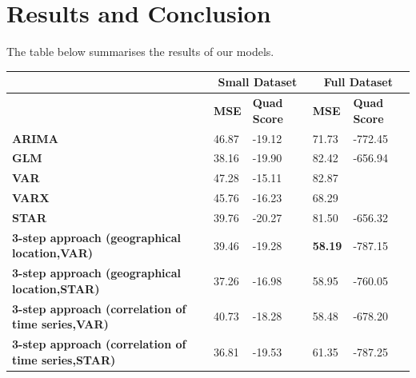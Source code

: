 \documentclass[nonblindrev,msom]{informs3} %
\begin{document}
\newpage
\section{Results and Conclusion}
The table below summarises the results of our models. 

\begin{table}[H]
\begin{tabular}{|l|l|l|l|l|}
\hline
                                                                      & \multicolumn{2}{c|}{\textbf{Small Dataset}} & \multicolumn{2}{c|}{\textbf{Full Dataset}} \\ \hline
                                                                      & \textbf{MSE}      & \textbf{Quad Score}     & \textbf{MSE}     & \textbf{Quad Score}     \\ \hline
\textbf{ARIMA}                                                        & 46.87             &      -19.12                   & 71.73            &                        -772.45 \\ \hline
\textbf{GLM}                                                          & 38.16             & -19.90                  & 82.42            & -656.94                 \\ \hline
\textbf{VAR}                                                          & 47.28             &   -15.11                      & 82.87            &                         \\ \hline
\textbf{VARX}                                                         & 45.76             &  -16.23                       & 68.29            &                         \\ \hline
\textbf{STAR}                                                         & 39.76             & -20.27                  & 81.50            & -656.32                 \\ \hline
\textbf{3-step approach (geographical location,VAR)}      & 39.46 &                        -19.28 & \textbf{58.19}            & -787.15                 \\ \hline
\textbf{3-step approach (geographical location,STAR)}      & 37.26 &                        -16.98 & 58.95            & -760.05             \\ \hline
\textbf{3-step approach (correlation of time series,VAR)} & 40.73             &      -18.28                  & 58.48           & -678.20                 \\ \hline
\textbf{3-step approach (correlation of time series,STAR)} & 36.81 &      -19.53                 & 61.35           & -787.25              \\ \hline

\end{tabular}
\end{table}
\end{document}
